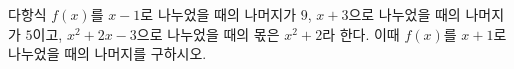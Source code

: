 다항식 $f(x)$를 $x-1$로 나누었을 때의 나머지가 $9$, $x+3$으로 나누었을 때의 나머지가 $5$이고, $x^2+2x-3$으로 나누었을 때의 몫은 $x^2+2$라 한다. 이때 $f(x)$를 $x+1$로 나누었을 때의 나머지를 구하시오.
